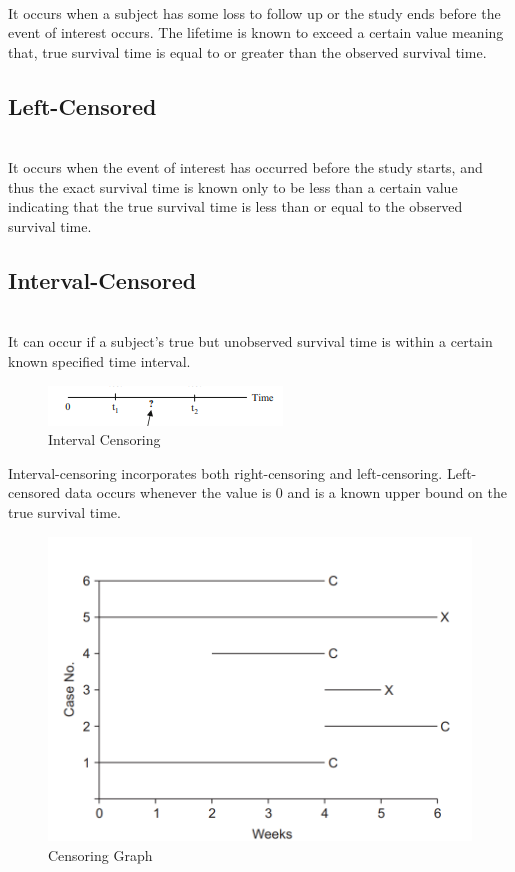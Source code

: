 \documentclass[doublespacing]{report} %
\begin{document}
\\It occurs when a subject has some loss to follow up or the study ends before the event of interest occurs. The lifetime is known to exceed a certain value meaning that, true survival time is equal to or greater than the observed survival time.

\subsection{Left-Censored}
\\
It occurs when the event of interest has occurred before the study starts, and thus the exact survival time is known only to be less than a certain value indicating that the true survival time is less than or equal to the observed survival time.

\subsection{Interval-Censored}
\\It can occur if a subject’s true but unobserved survival time is within a certain known specified time interval. 
\begin{figure}[H]
    \centering
    \includegraphics[width=0.4\linewidth]{Figure 3/3.1.png}
    \caption{Interval Censoring}
    \label{Figure 3.1}
\end{figure}

Interval-censoring incorporates both right-censoring and left-censoring. Left-censored data occurs whenever the value is 0 and  is a known upper bound on the true survival time. 

\begin{figure}[H]
    \centering
    \includegraphics[width=0.5\linewidth]{Figure 3/3.2.png}
    \caption{Censoring Graph}
    \label{Figure 3.2}
\end{figure}
\end{document}

